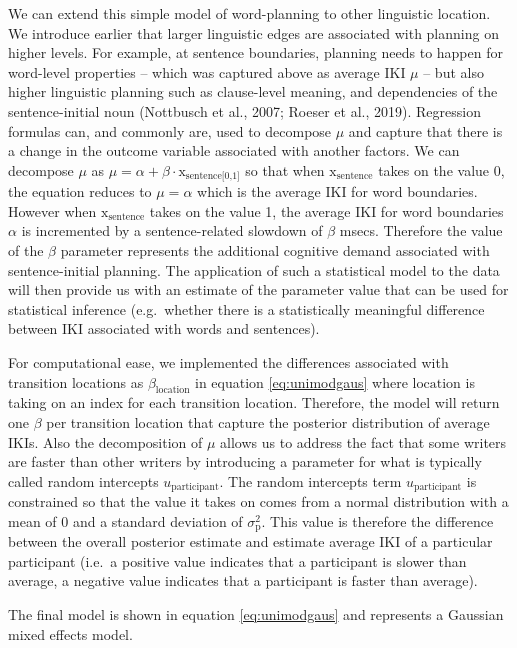 \documentclass[
  english,
  man,floatsintext]{apa7}
\begin{document}
We can extend this simple model of word-planning to other linguistic location. We introduce earlier that larger linguistic edges are associated with planning on higher levels. For example, at sentence boundaries, planning needs to happen for word-level properties -- which was captured above as average IKI \(\mu\) -- but also higher linguistic planning such as clause-level meaning, and dependencies of the sentence-initial noun (Nottbusch et al., 2007; Roeser et al., 2019). Regression formulas can, and commonly are, used to decompose \(\mu\) and capture that there is a change in the outcome variable associated with another factors. We can decompose \(\mu\) as \(\mu = \alpha + \beta \cdot \text{x}_\text{sentence[0,1]}\) so that when \(\text{x}_\text{sentence}\) takes on the value 0, the equation reduces to \(\mu = \alpha\) which is the average IKI for word boundaries. However when \(\text{x}_\text{sentence}\) takes on the value 1, the average IKI for word boundaries \(\alpha\) is incremented by a sentence-related slowdown of \(\beta\) msecs. Therefore the value of the \(\beta\) parameter represents the additional cognitive demand associated with sentence-initial planning. The application of such a statistical model to the data will then provide us with an estimate of the parameter value that can be used for statistical inference (e.g.~whether there is a statistically meaningful difference between IKI associated with words and sentences).

For computational ease, we implemented the differences associated with transition locations as \(\beta_\text{location}\) in equation \ref{eq:unimodgaus} where \(\text{location}\) is taking on an index for each transition location. Therefore, the model will return one \(\beta\) per transition location that capture the posterior distribution of average IKIs. Also the decomposition of \(\mu\) allows us to address the fact that some writers are faster than other writers by introducing a parameter for what is typically called random intercepts \(u_\text{participant}\). The random intercepts term \(u_\text{participant}\) is constrained so that the value it takes on comes from a normal distribution with a mean of 0 and a standard deviation of \(\sigma_\text{p}^2\). This value is therefore the difference between the overall posterior estimate and estimate average IKI of a particular participant (i.e.~a positive value indicates that a participant is slower than average, a negative value indicates that a participant is faster than average).

The final model is shown in equation \ref{eq:unimodgaus} and represents a Gaussian mixed effects model.
\end{document}
